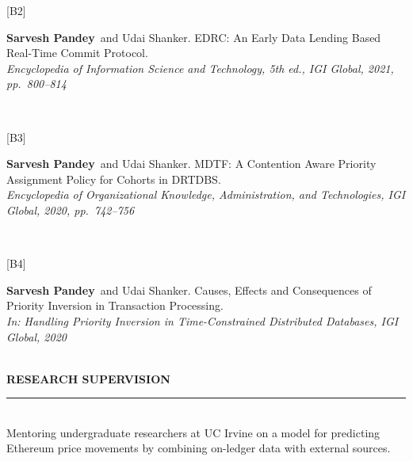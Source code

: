 \documentclass[11pt,a4paper]{article}
\newif\ifdraft
\newcommand{\todo}[1]{\ifdraft{\small\textcolor{red}{[TO COMPLETE: #1]}}\fi}
\newcommand{\draftonly}[1]{\ifdraft #1\fi}
\newcommand{\me}{\textbf{Sarvesh Pandey}}
\newcommand{\cvsection}[1]{%
  \vspace{1.05em}%
  {\normalsize\bfseries\uppercase{#1}}\\[-0.55em]%
  \rule{\textwidth}{0.6pt}\\[0.35em]%
}
\newcommand{\cvrow}[2]{%
  \begin{minipage}[t]{0.145\textwidth}\raggedright\small\textcolor{black!62}{#1}\end{minipage}%
  \hfill%
  \begin{minipage}[t]{0.835\textwidth}#2\end{minipage}\\[0.5em]%
}
\newcommand{\pub}[3]{%
  \begin{minipage}[t]{0.045\textwidth}\raggedright\small #1\end{minipage}%
  \begin{minipage}[t]{0.945\textwidth}#2\\{\small\itshape #3}\end{minipage}\\[0.34em]%
}
\begin{document}
\pub{[B2]}{\me\ and Udai Shanker. EDRC: An Early Data Lending Based Real-Time Commit Protocol.}{Encyclopedia of Information Science and Technology, 5th ed., IGI Global, 2021, pp.\ 800--814}

\pub{[B3]}{\me\ and Udai Shanker. MDTF: A Contention Aware Priority Assignment Policy for Cohorts in DRTDBS.}{Encyclopedia of Organizational Knowledge, Administration, and Technologies, IGI Global, 2020, pp.\ 742--756}

\pub{[B4]}{\me\ and Udai Shanker. Causes, Effects and Consequences of Priority Inversion in Transaction Processing.}{In: Handling Priority Inversion in Time-Constrained Distributed Databases, IGI Global, 2020}

\draftonly{
\cvsection{Teaching}

\cvrow{2020 -- present}{
  \textbf{Banaras Hindu University} --- Department of Computer Science (MMV)\\
  \todo{course names, codes, levels, and terms taught}
}
}

\cvsection{Research Supervision}

\todo{PhD / M.Tech.\ / undergraduate students supervised, with names, years, and thesis
topics. Suneel Kumar and Umesh Bhatt are first authors on four recent papers --- if they
are your students, say so explicitly; first-authorship by supervised students is strong
evidence of independent research leadership.}\draftonly{\\[0.4em]}
Mentoring undergraduate researchers at UC Irvine on a model for predicting Ethereum
price movements by combining on-ledger data with external sources.

\draftonly{
\cvsection{Professional Service}

\todo{journal reviewing, programme committee membership, session chairing, departmental
and institutional administrative roles at BHU.}
}

\draftonly{
\cvsection{Invited Talks}

\todo{e.g.\ guest lecture on ``Emerging Frontiers in AI'', KCC Institutes. Add venue,
title, and date for each.}
}
\end{document}
